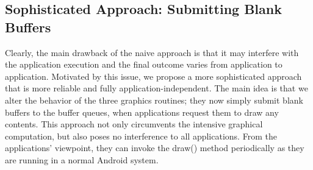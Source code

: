 \documentclass[conference]{IEEEtranl}
\begin{document}



	\subsection{Sophisticated Approach: Submitting Blank Buffers}
	Clearly, the main drawback of the naive approach is that it may interfere with the application execution and the final outcome varies from application to application. Motivated by this issue, we propose a more sophisticated approach that is more reliable and fully application-independent. The main idea is that we alter the behavior of the three graphics routines; they now simply submit blank buffers to the buffer queues, when applications request them to draw any contents. This approach not only circumvents the intensive graphical computation, but also poses no interference to all applications. From the applications' viewpoint, they can invoke the draw() method periodically as they are running in a normal Android system.
\end{document}
